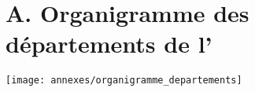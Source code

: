 \section*{A. Organigramme des départements de l'\ifsttar}
  \texttt{[image: annexes/organigramme\_departements]}
